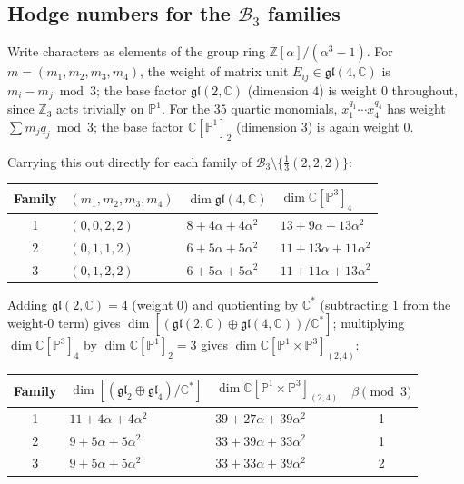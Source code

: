 \documentclass[11pt]{article}
\newcommand{\PP}{\mathbb{P}}
\newcommand{\ZZ}{\mathbb{Z}}
\newcommand{\CC}{\mathbb{C}}
\begin{document}
	\subsection{Hodge numbers for the $\mathcal{B}_3$ families}\label{sec:hodgenumbers}
	
	Write characters as elements of the group ring $\ZZ[\alpha]/(\alpha^3-1)$. For $m=(m_1,m_2,m_3,m_4)$, the weight of matrix unit $E_{ij}\in\mathfrak{gl}(4,\CC)$ is $m_i-m_j\bmod3$; the base factor $\mathfrak{gl}(2,\CC)$ (dimension $4$) is weight $0$ throughout, since $\ZZ_3$ acts trivially on $\PP^1$. For the $35$ quartic monomials, $x_1^{q_1}\cdots x_4^{q_4}$ has weight $\sum m_jq_j\bmod3$; the base factor $\CC[\PP^1]_2$ (dimension $3$) is again weight $0$.
	
	Carrying this out directly for each family of $\mathcal B_3\setminus\{\tfrac13(2,2,2)\}$:
	
	\begin{center}
		\begin{tabular}{c l l l}
			\hline
			Family & $(m_1,m_2,m_3,m_4)$ & $\dim\mathfrak{gl}(4,\CC)$ & $\dim\CC[\PP^3]_4$ \\
			\hline
			1 & $(0,0,2,2)$ & $8+4\alpha+4\alpha^2$ & $13+9\alpha+13\alpha^2$ \\
			2 & $(0,1,1,2)$ & $6+5\alpha+5\alpha^2$ & $11+13\alpha+11\alpha^2$ \\
			3 & $(0,1,2,2)$ & $6+5\alpha+5\alpha^2$ & $11+11\alpha+13\alpha^2$ \\
			\hline
		\end{tabular}
	\end{center}
	
	Adding $\mathfrak{gl}(2,\CC)=4$ (weight $0$) and quotienting by $\CC^*$ (subtracting $1$ from the weight-$0$ term) gives $\dim[(\mathfrak{gl}(2,\CC)\oplus\mathfrak{gl}(4,\CC))/\CC^*]$; multiplying $\dim\CC[\PP^3]_4$ by $\dim\CC[\PP^1]_2=3$ gives $\dim\CC[\PP^1\times\PP^3]_{(2,4)}$:
	
	\begin{center}
		\begin{tabular}{c l l c}
			\hline
			Family & $\dim[(\mathfrak{gl}_2\oplus\mathfrak{gl}_4)/\CC^*]$ & $\dim\CC[\PP^1\times\PP^3]_{(2,4)}$ & $\beta\pmod3$ \\
			\hline
			1 & $11+4\alpha+4\alpha^2$ & $39+27\alpha+39\alpha^2$ & 1 \\
			2 & $9+5\alpha+5\alpha^2$ & $33+39\alpha+33\alpha^2$ & 1 \\
			3 & $9+5\alpha+5\alpha^2$ & $33+33\alpha+39\alpha^2$ & 2 \\
			\hline
		\end{tabular}
	\end{center}
	
\end{document}

